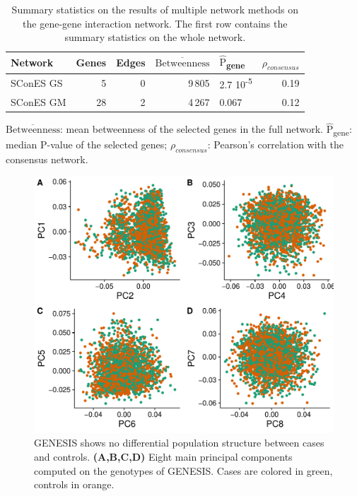 \documentclass[twocolumn, 11pt]{article}
\newcommand{\mean}[1]{$\overline{\mbox{#1}}$}
\newcommand{\median}[1]{$\hat{\mbox{#1}}$}
\begin{document}
\begin{table}[htbp]
\begin{threeparttable}
  \caption{\label{tab:scones_gene_solutions}
Summary statistics on the results of multiple network methods on the gene-gene interaction network. The first row contains the summary statistics on the whole network.}
\centering
\begin{tabular}{lrrrlr}
Network & Genes & Edges & \mean{Betweenness} & \median{P}\textsubscript{gene} & $\rho_{consensus}$\\
\hline
SConES GS & 5 & 0 & 9\,805 & 2.7 \texttimes{} 10\textsuperscript{-5} & 0.19\\
SConES GM & 28 & 2 & 4\,267 & 0.067 & 0.12\\
\end{tabular}
\begin{tablenotes}
  \footnotesize{
    \item \mean{Betweenness}: mean betweenness of the selected genes in the full network. \median{P}\textsubscript{gene}: median P-value of the selected genes; $\rho_{consensus}$: Pearson's correlation with the consensus network.
  }
\end{tablenotes}
\end{threeparttable}
\end{table}

\begin{figure}[htbp]
\centering
\includegraphics[width=.9\linewidth]{./figures/sfigure_1.pdf}
\caption{\label{sfig:pcs} GENESIS shows no differential population structure between cases and controls. \textbf{(A,B,C,D)} Eight main principal components computed on the genotypes of GENESIS. Cases are colored in green, controls in orange.}
\end{figure}
\end{document}
